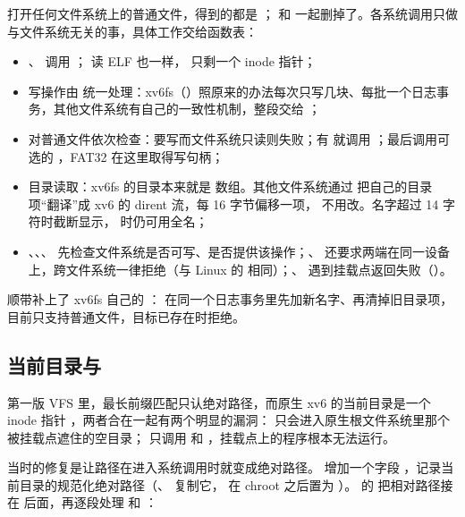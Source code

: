打开任何文件系统上的普通文件，得到的都是 ； 和  一起删掉了。各系统调用只做与文件系统无关的事，具体工作交给函数表：

\begin{itemize}
  \item {}、 调用 ； 读 ELF 也一样， 只剩一个 inode 指针；
  \item 写操作由  统一处理：xv6fs（）照原来的办法每次只写几块、每批一个日志事务，其他文件系统有自己的一致性机制，整段交给 ；
  \item {} 对普通文件依次检查：要写而文件系统只读则失败；有  就调用 ；最后调用可选的 ，FAT32 在这里取得写句柄；
  \item 目录读取：xv6fs 的目录本来就是  数组。其他文件系统通过  把自己的目录项“翻译”成 xv6 的 dirent 流，每 16 字节偏移一项， 不用改。名字超过 14 字符时截断显示， 时仍可用全名；
  \item {}、、、 先检查文件系统是否可写、是否提供该操作；、 还要求两端在同一设备上，跨文件系统一律拒绝（与 Linux 的  相同）；、 遇到挂载点返回失败（）。
\end{itemize}

顺带补上了 xv6fs 自己的 ： 在同一个日志事务里先加新名字、再清掉旧目录项，目前只支持普通文件，目标已存在时拒绝。

\subsection{当前目录与 }
\label{sec:vfs-cwd}

第一版 VFS 里，最长前缀匹配只认绝对路径，而原生 xv6 的当前目录是一个 inode 指针 ，两者合在一起有两个明显的漏洞： 只会进入原生根文件系统里那个被挂载点遮住的空目录； 只调用  和 ，挂载点上的程序根本无法运行。

当时的修复是让路径在进入系统调用时就变成绝对路径。 增加一个字段 ，记录当前目录的规范化绝对路径（、 复制它， 在 chroot 之后置为 \code{/}）。 的  把相对路径接在  后面，再逐段处理  和 ：


